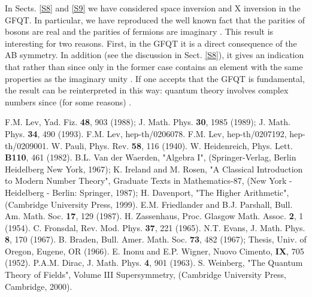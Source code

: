 \documentclass[a4paper,12pt]{article}%
\begin{document}
In Sects. \ref{S8} and \ref{S9} we have considered space
inversion and X inversion in the GFQT. In particular,
we have reproduced the well known fact that the parities
of bosons are real and the parities of fermions are 
imaginary \cite{Wein-super}. This result is interesting
for two reasons. First, in the GFQT it is a direct
consequence of the AB symmetry. In addition (see the
discussion in Sect. \ref{S8}), it gives an indication
that \coordHE{} rather than 
\coordHE{} since only in the former case
\coordHE{} contains an element with the same properties as
the imaginary unity \coordHE{}. If one accepts that the GFQT is
fundamental, the result can be reinterpreted in this
way: quantum theory involves complex numbers since 
(for some reasons) \coordHE{}.

\begin{thebibliography}{99}
 F.M. Lev, Yad. Fiz. {\bf 48}, 903 (1988); 
J. Math. Phys. {\bf 30}, 1985 (1989); J. Math. Phys. {\bf 34}, 
490 (1993).
 F.M. Lev, hep-th/0206078.
 F.M. Lev, hep-th/0207192, hep-th/0209001.
 W. Pauli, Phys. Rev. {\bf 58}, 116 (1940).
 W. Heidenreich, Phys. Lett. 
{\bf B110}, 461 (1982).
 B.L. Van der Waerden, "Algebra I", 
(Springer-Verlag, Berlin Heidelberg New York, 1967);
K. Ireland and  M. Rosen, "A Classical 
Introduction to Modern Number Theory", Graduate Texts in 
Mathematics-87, (New  York  - Heidelberg - Berlin: Springer, 1987); 
H. Davenport, "The Higher Arithmetic", 
(Cambridge University Press, 1999).
 E.M. Friedlander and B.J. Parshall, Bull. Am.
Math. Soc. {\bf 17}, 129 (1987).
 H. Zassenhaus, Proc. Glasgow Math. Assoc. 
{\bf 2}, 1 (1954).
 C. Fronsdal, Rev. Mod. Phys. 
{\bf 37}, 221 (1965).
 N.T. Evans, J. Math. Phys. 
{\bf 8}, 170 (1967). 
 B. Braden, Bull. Amer. Math. Soc. 
{\bf 73}, 482 (1967);
Thesis, Univ. of Oregon, Eugene, OR (1966).
 E. Inonu and E.P. Wigner, Nuovo Cimento, 
{\bf IX}, 705 (1952).
 P.A.M. Dirac, J. Math. Phys. 
{\bf 4}, 901 (1963).
 S. Weinberg, "The Quantum 
Theory of Fields", Volume III Supersymmetry, (Cambridge 
University Press, Cambridge, 2000).
\end{thebibliography}
\end{document}
